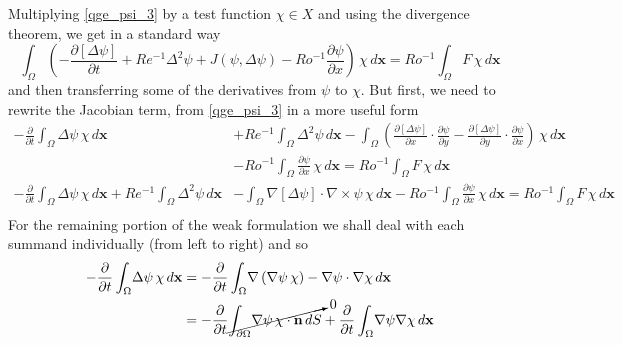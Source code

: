 Multiplying \eqref{qge_psi_3} by a test function $\chi \in X$ and using the divergence theorem, we
get in a standard way%
\begin{equation*}
  \int_{\Omega}\! \left(-\frac{\partial \left[ \Delta \psi \right]}{\partial t} + Re^{-1}
    \Delta^2 \psi +  J(\psi,\Delta \psi) - Ro^{-1}\frac{\partial \psi}{\partial
    x}\right)\, \chi \,d\mathbf{x} = Ro^{-1} \int_{\Omega}\! F\, \chi \,d\mathbf{x}
\end{equation*}
and then transferring some of the derivatives from $\psi$ to $\chi$. But first, we need to rewrite
the Jacobian term, from \eqref{qge_psi_3} in a more useful form
\begin{align*}
  -\frac{\partial}{\partial t} \int_{\Omega}\! \Delta \psi \, \chi \,d\mathbf{x}
    &+ Re^{-1} \int_{\Omega}\! \Delta^2 \psi \,d\mathbf{x}
    - \int_{\Omega}\! \left(\frac{\partial\left[\Delta\psi \right]}{\partial x}\cdot \frac{\partial
      \psi}{\partial y} -
    \frac{\partial\left[ \Delta\psi \right]}{\partial y}\cdot
    \frac{\partial \psi}{\partial x}\right)\, \chi\, d\mathbf{x} \\ 
    &- Ro^{-1} \int_{\Omega}\! \frac{\partial \psi}{\partial x}\, \chi \,d\mathbf{x} 
    = Ro^{-1} \int_{\Omega}\! F\, \chi \,d\mathbf{x} \\
  -\frac{\partial}{\partial t} \int_{\Omega}\! \Delta \psi \, \chi \,d\mathbf{x}
    + Re^{-1} \int_{\Omega}\! \Delta^2 \psi \,d\mathbf{x}
    & - \int_{\Omega}\! \nabla \left[\Delta\psi\right]\cdot \nabla \times \psi \, \chi\,
      d\mathbf{x} 
    -Ro^{-1} \int_{\Omega}\! \frac{\partial \psi}{\partial x}\, \chi \,d\mathbf{x} 
    = Ro^{-1} \int_{\Omega}\! F\, \chi \,d\mathbf{x} \\
\end{align*}
For the remaining portion of the weak formulation we shall deal with each summand individually (from
left to right) and so
\begin{align*}
  -\frac{\partial}{\partial t} \int_{\Omega}\! \Delta \psi\, \chi \,d\mathbf{x} &= 
    -\frac{\partial}{\partial t} \int_{\Omega}\! \nabla \left( \nabla \psi \, \chi \right) -
    \nabla \psi \cdot \nabla \chi \,d\mathbf{x} \\
  &= -\frac{\partial}{\partial t} \cancelto{0}{\int_{\partial \Omega}\! \nabla \psi \, \chi
    \cdot \mathbf{n} \, dS} + \frac{\partial}{\partial t} \int_{\Omega}\! \nabla \psi \nabla \chi
    \,d\mathbf{x}
\end{align*}
